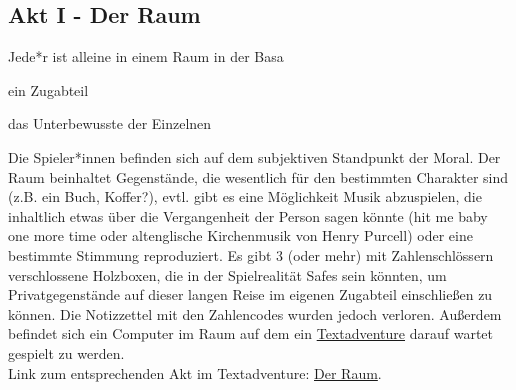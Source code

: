 \documentclass[12pt, a4paper, openany]{report}
\let\tempone\itemize
\let\temptwo\enditemize
\renewenvironment{itemize}{\tempone\addtolength{\itemsep}{-0.5\baselineskip}}{\temptwo}
\begin{document}
\subsection{Akt I - Der Raum}
\begin{itemize}
\item[R] Jede*r ist alleine in einem Raum in der Basa
\item[SR] ein Zugabteil 
\item[M] das Unterbewusste der Einzelnen
\item[P] Die Spieler*innen befinden sich auf dem subjektiven Standpunkt der Moral. 
\end{itemize}
Der Raum beinhaltet Gegenstände, die wesentlich für den bestimmten Charakter sind (z.B. ein Buch, Koffer?), evtl. gibt es eine Möglichkeit Musik abzuspielen, die inhaltlich etwas über die Vergangenheit der Person sagen könnte (\glqq hit me baby one more time\grqq{} oder altenglische Kirchenmusik von Henry Purcell) oder eine bestimmte Stimmung reproduziert.
 Es gibt 3 (oder mehr) mit Zahlenschlössern verschlossene Holzboxen, die in der Spielrealität Safes sein könnten, um Privatgegenstände auf dieser langen Reise im eigenen Zugabteil einschließen zu können.
Die Notizzettel mit den Zahlencodes wurden jedoch verloren.
Außerdem befindet sich ein Computer im Raum auf dem ein \hyperref[textadventure]{Textadventure} darauf wartet gespielt zu werden.\\
Link zum entsprechenden Akt im Textadventure: \hyperref[der-raum]{Der Raum}.
\end{document}
